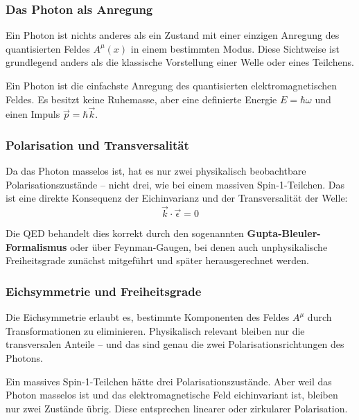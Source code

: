 \subsubsection*{Das Photon als Anregung}
Ein Photon ist nichts anderes als ein Zustand mit einer einzigen Anregung des quantisierten Feldes $A^\mu(x)$ in einem bestimmten Modus. Diese Sichtweise ist grundlegend anders als die klassische Vorstellung einer Welle oder eines Teilchens.

\vspace{0.5em}
\begin{tcolorbox}[physikbox, title=Was ist ein Photon in der QED?]
	\label{box:Warum ist ein Photon in der QED}
	Ein Photon ist die einfachste Anregung des quantisierten elektromagnetischen Feldes. Es besitzt keine Ruhemasse, aber eine definierte Energie $E = \hbar \omega$ und einen Impuls $\vec{p} = \hbar \vec{k}$.
\end{tcolorbox}

\subsubsection*{Polarisation und Transversalität}
Da das Photon masselos ist, hat es nur zwei physikalisch beobachtbare Polarisationszustände – nicht drei, wie bei einem massiven Spin-1-Teilchen. Das ist eine direkte Konsequenz der Eichinvarianz und der Transversalität der Welle:
\[
\vec{k} \cdot \vec{\epsilon} = 0
\]

Die QED behandelt dies korrekt durch den sogenannten \textbf{Gupta-Bleuler-Formalismus} oder über Feynman-Gaugen, bei denen auch unphysikalische Freiheitsgrade zunächst mitgeführt und später herausgerechnet werden.

\subsubsection*{Eichsymmetrie und Freiheitsgrade}
Die Eichsymmetrie erlaubt es, bestimmte Komponenten des Feldes $A^\mu$ durch Transformationen zu eliminieren. Physikalisch relevant bleiben nur die transversalen Anteile – und das sind genau die zwei Polarisationsrichtungen des Photons.

\vspace{1em}
\begin{tcolorbox}[didaktikbox, title=Warum hat das Photon keinen Spin-3-Zustand?]
	\label{box:Warum hat das Photon keinen Spin-3-Zustand}
	Ein massives Spin-1-Teilchen hätte drei Polarisationszustände. Aber weil das Photon masselos ist und das elektromagnetische Feld eichinvariant ist, bleiben nur zwei Zustände übrig. Diese entsprechen linearer oder zirkularer Polarisation.
\end{tcolorbox}

